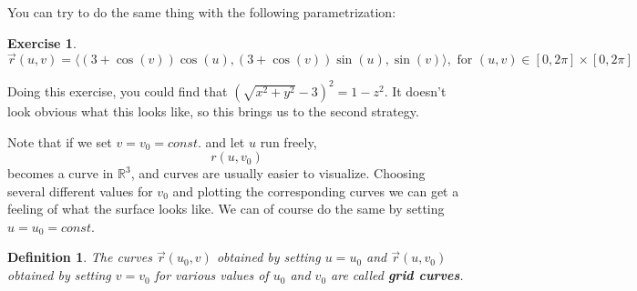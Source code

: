 \documentclass[12pt]{article}
\newcommand{\R}{ \mathbb{R}}
\newcommand{\vr}{\vec{r}{}}
\renewcommand{\lg}{\langle}
\newcommand{\rg}{\rangle}
\newtheorem{exercise}{Exercise}
\newtheorem{defn}{Definition}
\begin{document}
You can try to do the same thing with the following parametrization:
\begin{exercise}
$$\vr(u,v)=\lg (3+\cos(v))\cos(u),(3+\cos(v))\sin(u),\sin(v)\rg, \text{ for }(u,v)\in [0,2\pi]\times[0,2\pi]$$
\end{exercise}
Doing this exercise, you could find that $(\sqrt{x^2+y^2}-3)^2=1-z^2$. It doesn't look obvious what this looks like, so this brings us to the second strategy.


Note that if we set $v=v_0=const.$ and let $u$ run freely, $$r(u,v_0)$$ becomes a curve in $\R^3$, and curves are usually easier to visualize. Choosing several different values for $v_0$ and plotting the corresponding curves we can get a feeling of what the surface looks like. We can of course do the same by setting $u=u_0=const$. 

\begin{defn}
The curves $\vr(u_0,v)$ obtained by setting $u=u_0$ and $\vr(u,v_0)$ obtained by setting $v=v_0$ for various values of $u_0$ and $v_0$ are called \textbf{grid curves}.
\end{defn}
\end{document}
